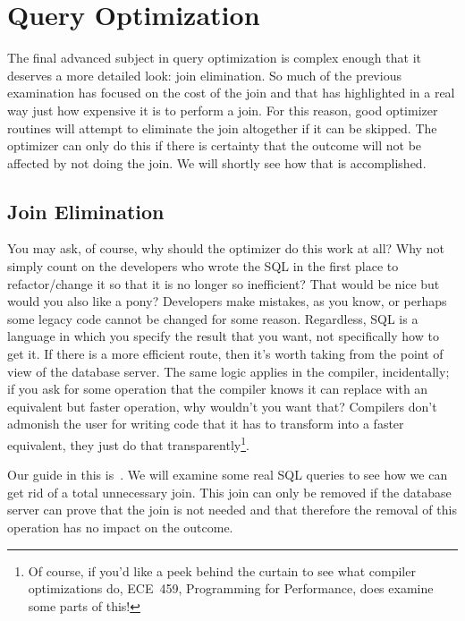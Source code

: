 




\section*{Query Optimization}

The final advanced subject in query optimization is complex enough that it deserves a more detailed look: join elimination. So much of the previous examination has focused on the cost of the join and that has highlighted in a real way just how expensive it is to perform a join. For this reason, good optimizer routines will attempt to eliminate the join altogether if it can be skipped. The optimizer can only do this if there is certainty that the outcome will not be affected by not doing the join. We will shortly see how that is accomplished.

\subsection*{Join Elimination}

You may ask, of course, why should the optimizer do this work at all? Why not simply count on the developers who wrote the SQL in the first place to refactor/change it so that it is no longer so inefficient? That would be nice but would you also like a pony?  Developers make mistakes, as you know, or perhaps some legacy code cannot be changed for some reason. Regardless, SQL is a language in which you specify the result that you want, not specifically how to get it. If there is a more efficient route, then it's worth taking from the point of view of the database server. The same logic applies in the compiler, incidentally; if you ask for some operation that the compiler knows it can replace with an equivalent but faster operation, why wouldn't you want that? Compilers don't admonish the user for writing code that it has to transform into a faster equivalent, they just do that transparently\footnote{Of course, if you'd like a peek behind the curtain to see what compiler optimizations do, ECE~459, Programming for Performance, does examine some parts of this!}.

Our guide in this is~\cite{joinelim}. We will examine some real SQL queries to see how we can get rid of a total unnecessary join. This join can only be removed if the database server can prove that the join is not needed and that therefore the removal of this operation has no impact on the outcome.


